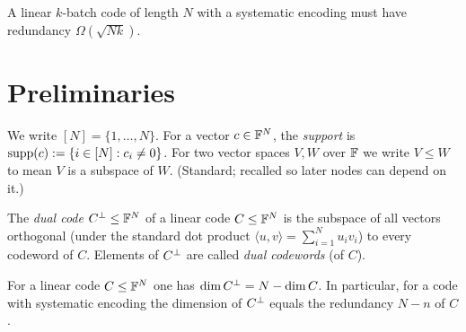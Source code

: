 \begin{theorem}
  \label{thm:main}
  A linear $k$-batch code of length $N$ with a systematic encoding must have
  redundancy $\Omega(\sqrt{Nk})$.
\end{theorem}


\chapter{Preliminaries}


\begin{definition}
  \label{def:notation}
  \mathlibok
  We write $[N] = \{1, \dots, N\}$. For a vector $c \in \mathbb{F}^N$, the
  \emph{support} is $\operatorname{supp}(c) := \{ i \in [N] : c_i \neq 0 \}$. For two vector
  spaces $V, W$ over $\mathbb{F}$ we write $V \le W$ to mean $V$ is a subspace of $W$.
  (Standard; recalled so later nodes can depend on it.)
\end{definition}


\begin{definition}
  \label{def:dual-code}
  \mathlibok
  The \emph{dual code} $C^{\perp} \le \mathbb{F}^N$ of a linear code $C \le \mathbb{F}^N$ is
  the subspace of all vectors orthogonal (under the standard dot product
  $\langle u, v\rangle = \sum_{i=1}^N u_i v_i$) to every codeword of $C$.
  Elements of $C^{\perp}$ are called \emph{dual codewords} (of $C$).
\end{definition}

\begin{lemma}
  \label{lem:dual-dim}
  \mathlibok
  For a linear code $C \le \mathbb{F}^N$ one has $\dim C^{\perp} = N - \dim C$. In
  particular, for a code with systematic encoding the dimension of $C^{\perp}$
  equals the redundancy $N - n$ of $C$.
\end{lemma}

